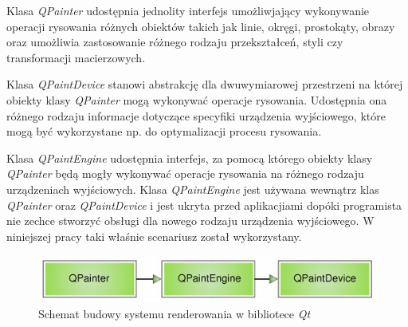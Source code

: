 Klasa \emph{QPainter} udostępnia jednolity interfejs umożliwjający wykonywanie operacji rysowania różnych obiektów takich jak linie, okręgi, prostokąty, obrazy oraz umożliwia zastosowanie różnego rodzaju przekształceń, styli czy transformacji macierzowych. 

Klasa \emph{QPaintDevice} stanowi abstrakcję dla dwuwymiarowej przestrzeni na której obiekty klasy \emph{QPainter} mogą wykonywać operacje rysowania. Udostępnia ona różnego rodzaju informacje dotyczące specyfiki urządzenia wyjściowego, które mogą być wykorzystane np. do optymalizacji procesu rysowania. 

Klasa \emph{QPaintEngine} udostępnia interfejs, za pomocą którego obiekty klasy \emph{QPainter} będą mogły wykonywać operacje rysowania na różnego rodzaju urządzeniach wyjściowych. Klasa \emph{QPaintEngine} jest używana wewnątrz klas \emph{QPainter} oraz \emph{QPaintDevice} i jest ukryta przed aplikacjiami dopóki programista nie zechce stworzyć obsługi dla nowego rodzaju urządzenia wyjściowego. W niniejszej pracy taki właśnie scenariusz został wykorzystany.
 
\begin{figure}[!h]
  \centering
  \includegraphics[width=\textwidth,height=!]{img/paintsystem-core.png}
  \caption{Schemat budowy systemu renderowania w bibliotece \emph{Qt}}
  \label{paintsystem-core}
\end{figure}